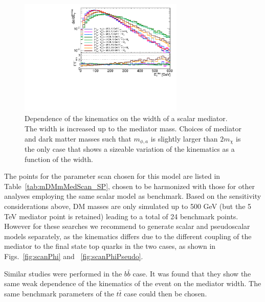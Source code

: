 \begin{figure}[!ht]
  \begin{center}
    \includegraphics[width=0.7\textwidth]{figures/ttbar/ScalarWidth.pdf}
    \vspace{2mm}
    \caption{\label{fig:widthlargescan} Dependence of the kinematics on the width of a scalar mediator. The width is increased up to the mediator mass. Choices of mediator and dark matter masses such that $m_{\phi,a}$ is slightly larger than $2m_\chi$ is the only case that shows a sizeable variation of the kinematics as a function of the width.  
    }
\end{center}
\end{figure}

The points for the parameter scan chosen for this model are listed in Table~\ref{tab:mDMmMedScan_SP}, chosen
to be harmonized with those for other analyses employing the same scalar model as benchmark. 
Based on the sensitivity considerations above, DM masses are only simulated up to 500 GeV (but the 5 TeV mediator point is retained)
leading to a total of 24 benchmark points. However for these searches we recommend to generate scalar and pseudoscalar
models separately, as the kinematics differs due to the different coupling of the mediator to the final state top quarks in the two cases,
as shown in Figs.~\ref{fig:scanPhi} and ~\ref{fig:scanPhiPseudo}.

Similar studies were performed in the $b \bar b$ case. It was found that they 
show the same weak dependence of the kinematics of the event on the mediator width.
The same benchmark parameters of the $t\bar t$ case could then be chosen.


